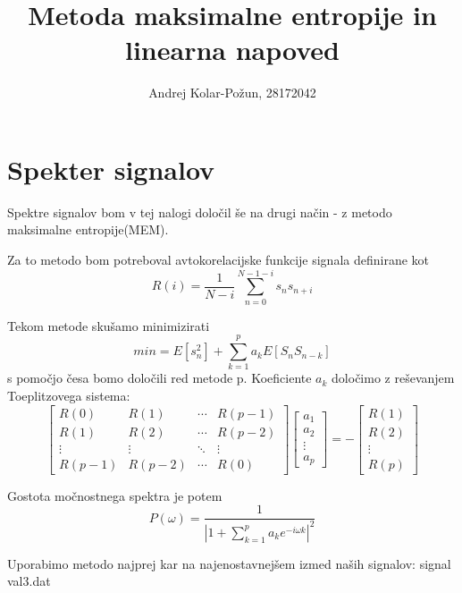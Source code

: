 \documentclass{article}
\title{Metoda maksimalne entropije in linearna napoved}
\author{Andrej Kolar-Požun, 28172042}
\begin{document}
\maketitle
\newpage
{}
\section{Spekter signalov}

Spektre signalov bom v tej nalogi določil še na drugi način - z metodo maksimalne entropije(MEM).

Za to metodo  bom potreboval avtokorelacijske funkcije signala definirane kot
\begin{equation*}
R(i) = \frac{1}{N-i} \sum_{n=0}^{N-1-i} s_{n} s_{n+i}
\end{equation*}

Tekom metode skušamo minimizirati
\begin{equation*}
min = E[s_n^2] + \sum_{k=1}^p a_k E[S_n S_{n-k}] 
\end{equation*}
s pomočjo česa bomo določili red metode p.
Koeficiente $a_k$ določimo z reševanjem Toeplitzovega sistema:
\begin{equation*}
\begin{bmatrix} 
R(0) & R(1) &  \cdots & R(p-1) \\ 
R(1) & R(2) & \cdots & R(p-2) \\
\vdots & \vdots &  \ddots & \vdots \\
R(p-1) & R(p-2) & \cdots & R(0) \end{bmatrix}  \begin{bmatrix}a_1 \\ a_2 \\ \vdots \\ a_p\end{bmatrix} = -\begin{bmatrix}R(1) \\ R(2) \\ \vdots \\ R(p)\end{bmatrix} 
\end{equation*}

Gostota močnostnega spektra je potem 
\begin{equation*}
P(\omega) = \frac{1}{|1+ \sum_{k=1}^p a_k e^{-i \omega k}|^2}
\end{equation*}

Uporabimo metodo najprej kar na najenostavnejšem izmed naših signalov: signal val3.dat
\end{document}
